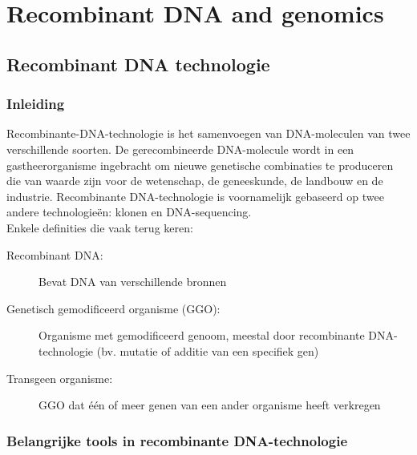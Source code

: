 \documentclass[a4paper,kul]{kulakarticle} %
\begin{document}
\newpage
\section{Recombinant DNA and genomics}
\label{sec:dnaandgenomics}
\subsection{Recombinant DNA technologie}
\subsubsection{Inleiding}
Recombinante-DNA-technologie is het samenvoegen van DNA-moleculen van twee verschillende soorten. De gerecombineerde DNA-molecule wordt in een gastheerorganisme ingebracht om nieuwe genetische combinaties te produceren die van waarde zijn voor de wetenschap, de geneeskunde, de landbouw en de industrie. Recombinante DNA-technologie is voornamelijk gebaseerd op twee andere technologieën: klonen en DNA-sequencing.\\
Enkele definities die vaak terug keren:
\begin{description}
	\item[Recombinant DNA:] Bevat DNA van verschillende bronnen
	\item[Genetisch gemodificeerd organisme (GGO):] Organisme met gemodificeerd genoom, meestal door recombinante DNA-technologie (bv. mutatie of additie van een specifiek gen)
	\item[Transgeen organisme:] GGO dat één of meer genen van een ander organisme heeft verkregen 
\end{description}
\subsubsection{Belangrijke tools in recombinante DNA-technologie}
\end{document}
